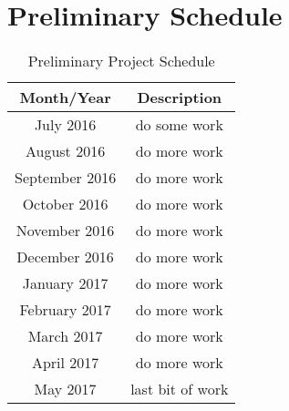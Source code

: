 %
\chapter{Preliminary Schedule}
\label{sec:schedule}


\begin{table}
\centering
\begin{tabular}{|c|c|}
\hline
 \textbf{Month/Year} & \textbf{Description} \\ \hline
 July 2016      & do some work \\ \hline
 August 2016    & do more work \\ \hline
 September 2016 & do more work \\ \hline
 October 2016   & do more work \\ \hline
 November 2016  & do more work \\ \hline
 December 2016  & do more work \\ \hline
 January 2017   & do more work \\ \hline
 February 2017  & do more work \\ \hline
 March 2017     & do more work \\ \hline
 April 2017     & do more work \\ \hline
 May 2017       & last bit of work \\ \hline 
\end{tabular}
\caption{Preliminary Project Schedule}
\label{sec:schedule:preliminary-schedule}
\end{table}



%
%
%
%
%
%
%
%
%
%
%


